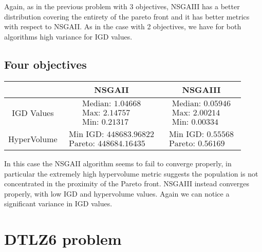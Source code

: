 \documentclass[a4paper,11pt]{article}
\numberwithin{equation}{section}
\begin{document}
\noindent Again, as in the previous problem with 3 objectives, NSGAIII has a better distribution covering the entirety of the pareto front and it has better metrics  with respect to NSGAII. As in the case with 2 objectives, we have for both algorithms high variance for IGD values. 

\subsection{Four objectives}

\begin{table}[!h]
\begin{center}
\begin{tabular}{|c|c|c|}
\hline
 & NSGAII & NSGAIII \\
\hline
IGD Values &$\begin{array}{l}
\text{Median: 1.04668}\\
\text{Max: 2.14757}\\
\text{Min: 0.21317}\end{array}$&
$\begin{array}{l}
\text{Median: 0.05946}\\
\text{Max: 2.00214}\\
\text{Min: 0.00334}\end{array}$\\
\hline
HyperVolume &$\begin{array}{l}
\text{Min IGD: 448683.96822}\\
\text{Pareto: 448684.16435}\end{array}$&
$\begin{array}{l}
\text{Min IGD: 0.55568}\\
\text{Pareto: 0.56169}\end{array}$\\
\hline
\end{tabular}
\end{center}
\end{table}

\noindent In this case the NSGAII algorithm seems to fail to converge properly, in particular the extremely high hypervolume metric suggests the population is not concentrated in the proximity of the Pareto front. NSGAIII instead converges properly, with low IGD and hypervolume values. Again we can notice a significant variance in IGD values. 

\section{DTLZ6 problem}
\end{document}
